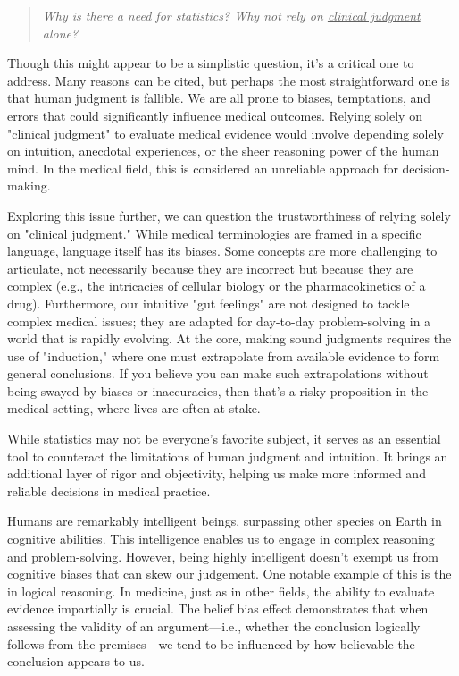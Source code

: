 \begin{quote}
{\it Why is there a need for statistics? Why not rely on \underline{clinical judgment} alone?}
\end{quote}

Though this might appear to be a simplistic question, it's a critical one to address. Many reasons can be cited, but perhaps the most straightforward one is that human judgment is fallible. We are all prone to biases, temptations, and errors that could significantly influence medical outcomes. Relying solely on "clinical judgment" to evaluate medical evidence would involve depending solely on intuition, anecdotal experiences, or the sheer reasoning power of the human mind. In the medical field, this is considered an unreliable approach for decision-making.

Exploring this issue further, we can question the trustworthiness of relying solely on "clinical judgment." While medical terminologies are framed in a specific language, language itself has its biases. Some concepts are more challenging to articulate, not necessarily because they are incorrect but because they are complex (e.g., the intricacies of cellular biology or the pharmacokinetics of a drug). Furthermore, our intuitive "gut feelings" are not designed to tackle complex medical issues; they are adapted for day-to-day problem-solving in a world that is rapidly evolving. At the core, making sound judgments requires the use of "induction," where one must extrapolate from available evidence to form general conclusions. If you believe you can make such extrapolations without being swayed by biases or inaccuracies, then that's a risky proposition in the medical setting, where lives are often at stake.

While statistics may not be everyone's favorite subject, it serves as an essential tool to counteract the limitations of human judgment and intuition. It brings an additional layer of rigor and objectivity, helping us make more informed and reliable decisions in medical practice.


Humans are remarkably intelligent beings, surpassing other species on Earth in cognitive abilities. This intelligence enables us to engage in complex reasoning and problem-solving. However, being highly intelligent doesn't exempt us from cognitive biases that can skew our judgement. One notable example of this is the  in logical reasoning. In medicine, just as in other fields, the ability to evaluate evidence impartially is crucial. The belief bias effect demonstrates that when assessing the validity of an argument—i.e., whether the conclusion logically follows from the premises—we tend to be influenced by how believable the conclusion appears to us.

